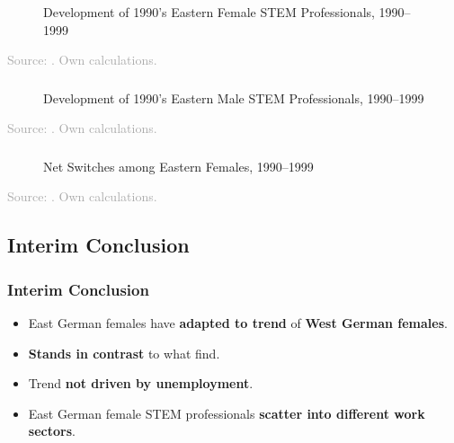 \documentclass[11pt, aspectratio=1610, xcolor={dvipsnames}]{beamer}
\newcommand{\highlight}[1]{\textbf{\textcolor{PineGreen}{#1}}}
\begin{document}
	\begin{frame}
		\frametitle{}
		
		\begin{figure}[h]
			\centering
			\caption{Development of 1990's Eastern Female STEM Professionals, 1990--1999}
			\label{fig:survival_female}
			\resizebox{75mm}{!}{}
		\end{figure}
		
		{\scriptsize
			\textcolor{darkgray}{Source: \cite{SOEP2023}. Own calculations.}
		}
		
	\end{frame}
	
	\begin{frame}
		\frametitle{}
		
		\begin{figure}[h]
			\centering
			\caption{Development of 1990's Eastern Male STEM Professionals, 1990--1999}
			\label{fig:survival_male}
			\resizebox{75mm}{!}{}
		\end{figure}
		
		{\scriptsize
			\textcolor{darkgray}{Source: \cite{SOEP2023}. Own calculations.}
		}
		
	\end{frame}
	
	\begin{frame}
		\frametitle{}
		
		\begin{figure}[h]
			\centering
			\caption{Net Switches among Eastern Females, 1990--1999}
			\label{fig:eastern_female_tracking}
			\resizebox{75mm}{!}{}
		\end{figure}
		
		{\scriptsize
			\textcolor{darkgray}{Source: \cite{SOEP2023}. Own calculations.}
		}
		
	\end{frame}
	
	\subsection{Interim Conclusion}
	\begin{frame}
		\frametitle{Interim Conclusion}
		
		\begin{itemize}
			\item East German females have \highlight{adapted to trend} of \highlight{West German females}.
			\item \highlight{Stands in contrast} to what \highlight{\cite{Jessen2023}} find.
			\item Trend \highlight{not driven by unemployment}.
			\item East German female STEM professionals \highlight{scatter into different work sectors}.
		\end{itemize}
		
	\end{frame}
	
\end{document}
